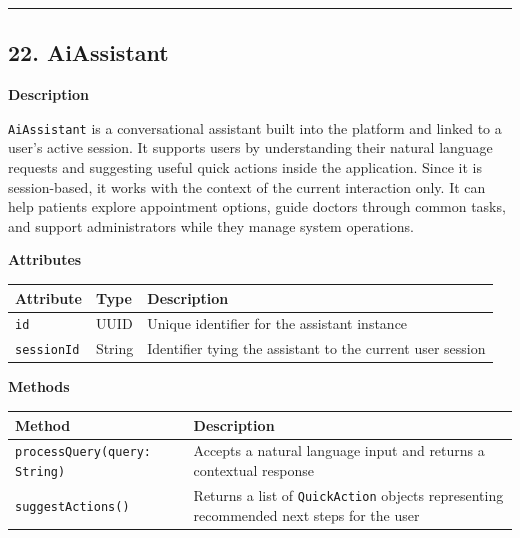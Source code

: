 \documentclass[12pt, a4paper]{article}
\begin{document}
\par\medskip\hrule\medskip

\subsection{22. AiAssistant}\label{sec:22-aiassistant}

\textbf{Description}

\texttt{AiAssistant} is a conversational assistant built into the platform and linked to a user's active session. It supports users by understanding their natural language requests and suggesting useful quick actions inside the application. Since it is session-based, it works with the context of the current interaction only. It can help patients explore appointment options, guide doctors through common tasks, and support administrators while they manage system operations.

\textbf{Attributes}

\begin{center}
\small
\renewcommand{\arraystretch}{1.35}
\begin{tabularx}{\textwidth}{|>{\raggedright\arraybackslash}p{3.4cm}|>{\raggedright\arraybackslash}p{3.3cm}|Y|}
\hline
{}
\textbf{Attribute} & \textbf{Type} & \textbf{Description} \\ \hline
\texttt{id} & UUID & Unique identifier for the assistant instance \\ \hline
\texttt{sessionId} & String & Identifier tying the assistant to the current user session \\ \hline
\end{tabularx}
\end{center}

\textbf{Methods}

\begin{center}
\small
\renewcommand{\arraystretch}{1.35}
\begin{tabularx}{\textwidth}{|M|Y|}
\hline
{}
\textbf{Method} & \textbf{Description} \\ \hline
\texttt{processQuery(query: String)} & Accepts a natural language input and returns a contextual response \\ \hline
\texttt{suggestActions()} & Returns a list of \texttt{QuickAction} objects representing recommended next steps for the user \\ \hline
\end{tabularx}
\end{center}
\end{document}
